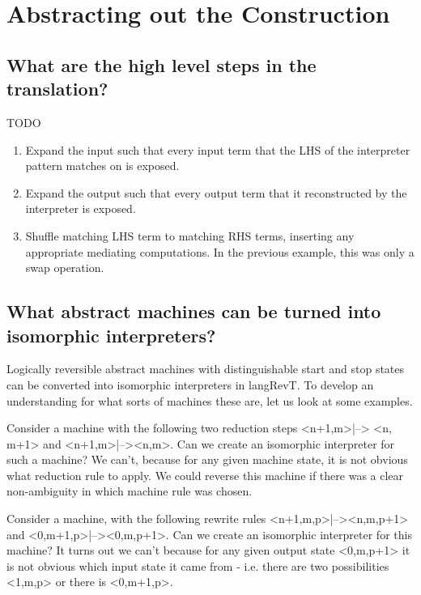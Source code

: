 \documentclass{llncs}
\begin{document}
\section{Abstracting out the Construction}

\subsection{What are the high level steps in the translation?}
\label{sec:steps}

TODO

\begin{enumerate}
\item Expand the input such that every input term that the LHS of the
  interpreter pattern matches on is exposed.

\item Expand the output such that every output term that it
  reconstructed by the interpreter is exposed.

\item Shuffle matching LHS term to matching RHS terms, inserting any
  appropriate mediating computations. In the previous example, this
  was only a swap operation.

\end{enumerate}

\subsection{What abstract machines can be turned into isomorphic interpreters?}

Logically reversible abstract machines with distinguishable start and
stop states can be converted into isomorphic interpreters in
{{langRevT}}.  To develop an understanding for what sorts of machines
these are, let us look at some examples.

Consider a machine with the following two reduction steps
{{<n+1,m>|--> <n, m+1>}} and {{<n+1,m>|--><n,m>}}. Can we create an
isomorphic interpreter for such a machine? We can't, because for any
given machine state, it is not obvious what reduction rule to
apply. We could reverse this machine if there was a clear
non-ambiguity in which machine rule was chosen.

Consider a machine, with the following rewrite rules
{{<n+1,m,p>|--><n,m,p+1>}} and {{<0,m+1,p>|--><0,m,p+1>}}. Can we
create an isomorphic interpreter for this machine? It turns out we
can't because for any given output state {{<0,m,p+1>}} it is not
obvious which input state it came from - i.e. there are two
possibilities {{<1,m,p>}} or there is {{<0,m+1,p>}}.
\end{document}
